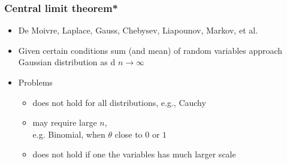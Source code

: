 \documentclass[10pt,handout]{beamer}
\begin{document}
\begin{frame}

  \frametitle{Central limit theorem*}

  \begin{itemize}
  \item De Moivre, Laplace, Gauss, Chebysev, Liapounov, Markov, et al.
  \item Given certain conditions sum (and mean) of random variables
    approach Gaussian distribution as d $n \rightarrow \infty$
  \item Problems
    \begin{itemize}
    \item does not hold for all distributions, e.g., Cauchy
    \item may require large $n$,\\ e.g.
      Binomial, when $\theta$ close to $0$ or $1$
    \item does not hold if one the variables has much larger scale
    \end{itemize}
  \end{itemize}

\end{frame}



\end{document}
